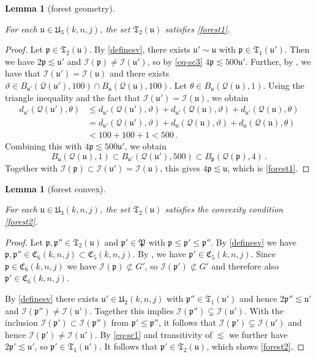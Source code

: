 \documentclass[10pt,a4paper]{article}
\theoremstyle{plain}
\newtheorem{lemma}[theorem]{Lemma}
\theoremstyle{definition}
\numberwithin{equation}{subsection}
\newcommand{\fp}{{\mathfrak p}}
\newcommand{\fP}{{\mathfrak P}}
\newcommand{\fu}{{\mathfrak u}}
\newcommand{\fU}{{\mathfrak U}}
\newcommand{\fC}{{\mathfrak C}}
\newcommand{\scI}{{\mathcal{I}}} %
\newcommand{\mfa}{{\vartheta}}
\newcommand{\mfb}{{\theta}}
\newcommand{\fcc}{{\mathcal{Q}}}
\newcommand{\lean}[1]{}
\newcommand{\uses}[1]{}
\newcommand{\leanok}{}
\begin{document}
\begin{lemma}[forest geometry]
    \label{forest-geometry}
    \uses{relation-geometry}
    \leanok
    \lean{forest_geometry}
    For each $\fu\in \fU_3(k,n,j)$,
    the set $\mathfrak{T}_2(\fu)$
    satisfies \eqref{forest1}.
\end{lemma}
\begin{proof}
    \leanok
    Let $\fp \in \mathfrak{T}_2(\fu)$. By \eqref{definesv}, there exists $\fu' \sim \fu$ with $\fp \in \mathfrak{T}_1(\fu')$. Then we have $2\fp \lesssim \fu'$ and $\scI(\fp) \ne \scI(\fu')$, so by \eqref{eq-sc3} $4\fp \lesssim 500\fu'$.
    Further, by , we have that $\scI(\fu') = \scI(\fu)$ and there exists $\mfa \in B_{\fu'}(\fcc(\fu'),100) \cap B_{\fu}(\fcc(\fu),100)$.
    Let $\mfb \in B_{\fu}(\fcc(\fu), 1)$.
    Using the triangle inequality and the fact that $\scI(\fu') =\scI(\fu)$, we obtain
    \begin{align*}
        d_{\fu'}(\fcc(\fu'), \mfb) &\le d_{\fu'}(\fcc(\fu'), \mfa) + d_{\fu'}(\fcc(\fu), \mfa) + d_{\fu'}(\fcc(\fu), \mfb)\\
        &= d_{\fu'}(\fcc(\fu'), \mfa) + d_{\fu}(\fcc(\fu), \mfa) + d_{\fu}(\fcc(\fu), \mfb)\\
        &< 100 + 100 + 1 < 500\,.
    \end{align*}
    Combining this with $4\fp \lesssim 500\fu'$, we obtain
    $$
        B_{\fu}(\fcc(\fu), 1) \subset B_{\fu'}(\fcc(\fu'), 500) \subset B_{\fp}(\fcc(\fp), 4)\,.
    $$
    Together with $\scI(\fp) \subset \scI(\fu') = \scI(\fu)$, this gives $4\fp \lesssim \fu$, which is \eqref{forest1}.
\end{proof}

\begin{lemma}[forest convex]
    \label{forest-convex}
    \uses{C5-convex}
    \leanok
    \lean{forest_convex}
    For each $\fu\in \fU_3(k,n,j)$,
    the set $\mathfrak{T}_2(\fu)$
    satisfies the convexity condition \eqref{forest2}.
\end{lemma}

\begin{proof}
    \leanok
    Let $\fp, \fp'' \in \mathfrak{T}_2(\fu)$ and $\fp' \in \fP$ with $\fp \le \fp' \le \fp''$. By \eqref{definesv} we have $\fp, \fp'' \in \fC_6(k,n,j) \subset \fC_5(k,n,j)$. By , we have $\fp' \in \fC_5(k,n,j)$. Since $\fp \in \fC_6(k,n,j)$ we have $\scI(\fp) \not \subset G'$, so $\scI(\fp') \not \subset G'$ and therefore also $\fp' \in \fC_6(k,n,j)$.

    By \eqref{definesv} there exists $\fu' \in \fU_2(k,n,j)$ with $\fp'' \in \mathfrak{T}_1(\fu')$ and hence $2\fp'' \lesssim \fu'$ and $\scI(\fp'') \ne \scI(\fu')$. Together this implies $\scI(\fp'') \subsetneq \scI(\fu')$. With the inclusion $\scI(\fp') \subset \scI(\fp'')$ from $\fp' \le \fp''$, it follows that $\scI(\fp') \subsetneq \scI(\fu')$ and hence $\scI(\fp') \ne \scI(\fu')$.
    By \eqref{eq-sc1} and transitivity of $\lesssim$ we further have $2\fp' \lesssim \fu'$, so $\fp' \in \mathfrak{T}_1(\fu')$.
    It follows that $\fp' \in \mathfrak{T}_2(\fu)$, which shows \eqref{forest2}.
\end{proof}
\end{document}
